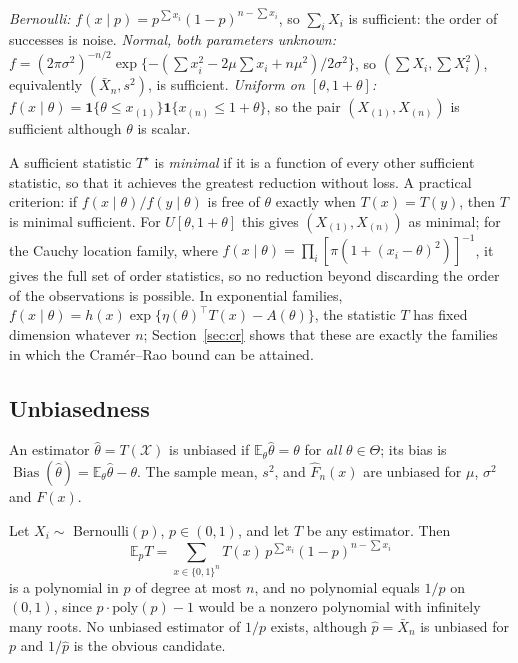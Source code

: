 \documentclass[11pt,a4paper]{article}
\newcommand{\E}{\mathbb{E}}
\newcommand{\Bias}{\operatorname{Bias}}
\newcommand{\one}{\mathbf 1}
\newcommand{\Xbar}{\bar X_n}
\newcommand{\Fn}{\widehat F_n}
\begin{document}
\begin{example}
\emph{Bernoulli:} $f(x\mid p)=p^{\sum x_i}(1-p)^{n-\sum x_i}$, so $\sum_iX_i$ is sufficient: the order of successes is noise. \emph{Normal, both parameters unknown:} $f=(2\pi\sigma^2)^{-n/2}\exp\{-(\sum x_i^2-2\mu\sum x_i+n\mu^2)/2\sigma^2\}$, so $(\sum X_i,\sum X_i^2)$, equivalently $(\Xbar,s^2)$, is sufficient. \emph{Uniform on $[\theta,1+\theta]$:} $f(x\mid\theta)=\one\{\theta\le x_{(1)}\}\one\{x_{(n)}\le1+\theta\}$, so the pair $(X_{(1)},X_{(n)})$ is sufficient although $\theta$ is scalar.
\end{example}

A sufficient statistic $T^\star$ is \emph{minimal} if it is a function of every other sufficient statistic, so that it achieves the greatest reduction without loss. A practical criterion: if $f(x\mid\theta)/f(y\mid\theta)$ is free of $\theta$ exactly when $T(x)=T(y)$, then $T$ is minimal sufficient. For $U[\theta,1+\theta]$ this gives $(X_{(1)},X_{(n)})$ as minimal; for the Cauchy location family, where $f(x\mid\theta)=\prod_i[\pi(1+(x_i-\theta)^2)]^{-1}$, it gives the full set of order statistics, so no reduction beyond discarding the order of the observations is possible. In exponential families, $f(x\mid\theta)=h(x)\exp\{\eta(\theta)^\top T(x)-A(\theta)\}$, the statistic $T$ has fixed dimension whatever $n$; Section~\ref{sec:cr} shows that these are exactly the families in which the Cram\'er--Rao bound can be attained.

\subsection{Unbiasedness}\label{sec:unbiased}

An estimator $\hat\theta=T(\mathcal X)$ is unbiased if $\E_\theta\hat\theta=\theta$ for \emph{all} $\theta\in\Theta$; its bias is $\Bias(\hat\theta)=\E_\theta\hat\theta-\theta$. The sample mean, $s^2$, and $\Fn(x)$ are unbiased for $\mu$, $\sigma^2$ and $F(x)$.

\begin{example}
Let $X_i\sim$ Bernoulli$(p)$, $p\in(0,1)$, and let $T$ be any estimator. Then
\[
\E_pT=\sum_{x\in\{0,1\}^n}T(x)\,p^{\sum x_i}(1-p)^{n-\sum x_i}
\]
is a polynomial in $p$ of degree at most $n$, and no polynomial equals $1/p$ on $(0,1)$, since $p\cdot\mathrm{poly}(p)-1$ would be a nonzero polynomial with infinitely many roots. No unbiased estimator of $1/p$ exists, although $\hat p=\Xbar$ is unbiased for $p$ and $1/\hat p$ is the obvious candidate.
\end{example}
\end{document}
